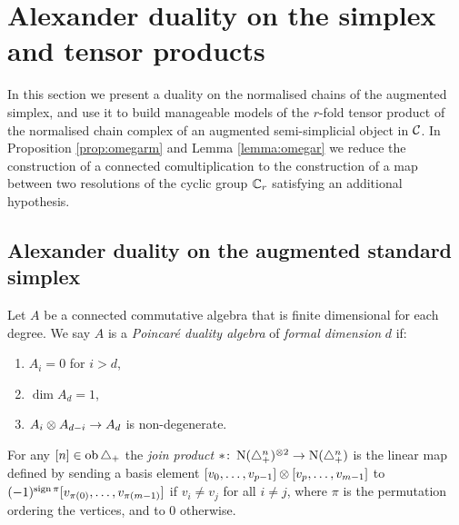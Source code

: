 
\section{Alexander duality on the simplex and tensor products}\label{s:3complexes}

In this section we present a duality on the normalised chains of the augmented simplex, and use it to build manageable models of the $r$-fold tensor product of the normalised chain complex of an augmented semi-simplicial object in $\mathcal{C}$. In Proposition \ref{prop:omegarm} and Lemma \ref{lemma:omegar} we reduce the construction of a connected comultiplication to the construction of a map between two resolutions of the cyclic group $\mathbb{C}_r$ satisfying an additional hypothesis.

\subsection{Alexander duality on the augmented standard simplex}


 

\begin{definition}\label{d:poincare_duality_algebra}
	Let $A$ be a connected commutative algebra that is finite dimensional for each degree.
	We say $A$ is a \textit{Poincar\'e duality algebra} of \textit{formal dimension} $d$ if:
	\begin{enumerate}
		\item\label{i:pd1} $A_i = 0$ for $i > d$,
		\item\label{i:pd2} $\dim A_d = 1$,
		\item\label{i:pd3} $A_i \otimes A_{d-i} \to A_d$ is non-degenerate.
	\end{enumerate}
\end{definition}

\begin{definition}\label{d:join_product}
	For any $[n] \in \operatorname{ob}\triangle_{+}$ the \textit{join product} $\ast \colon \operatorname{N}(\triangle_{+}^{n})^{\otimes 2} \to \operatorname{N}(\triangle_{+}^{n})$ is the linear map defined by sending a basis element $[v_0, \dots, v_{p-1}] \otimes [v_{p},\dots,v_{m-1}]$ to $(-1)^{\operatorname{sign} \pi}[v_{\pi(0)}, \dots, v_{\pi(m-1)}]$	if $v_i \neq v_j$ for all $i \neq j$, where $\pi$ is the permutation ordering the vertices, and to $0$ otherwise.
\end{definition}

